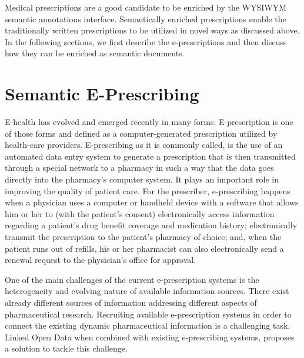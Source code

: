 \documentclass[journal]{IEEEtran}
\begin{document}
Medical prescriptions are a good candidate to be enriched by the WYSIWYM semantic annotations interface.
Semantically enriched prescriptions enable the traditionally written prescriptions to be utilized in novel ways as discussed above.
In the following sections, we first describe the e-prescriptions and then discuss how they can be enriched as semantic documents.

\section{Semantic E-Prescribing}
\label{sec:sep}

E-health has evolved and emerged recently in many forms.
E-prescription is one of those forms and defined as a computer-generated prescription utilized by health-care providers.
E-prescribing as it is commonly called, is the use of an automated data entry system to generate a prescription that is then transmitted through a special network to a pharmacy in such a way that the data goes directly into the pharmacy’s computer system.
It plays an important role in improving the quality of patient care.
For the prescriber, e-prescribing happens when a physician uses a computer or handheld device with a software that allows him or her to (with the patient’s consent) electronically access information regarding a patient’s drug benefit coverage and medication history; electronically transmit the prescription to the patient’s pharmacy of choice; and, when the patient runs out of refills, his or her pharmacist can also electronically send a renewal request to the physician’s office for approval.

One of the main challenges of the current e-prescription systems is the heterogeneity and evolving nature of available information sources.
There exist already different sources of information addressing different aspects of pharmaceutical research.
Recruiting available e-prescription systems in order to connect the existing dynamic pharmaceutical information is a challenging task.
Linked Open Data when combined with existing e-prescribing systems, proposes a solution to tackle this challenge.
\end{document}
